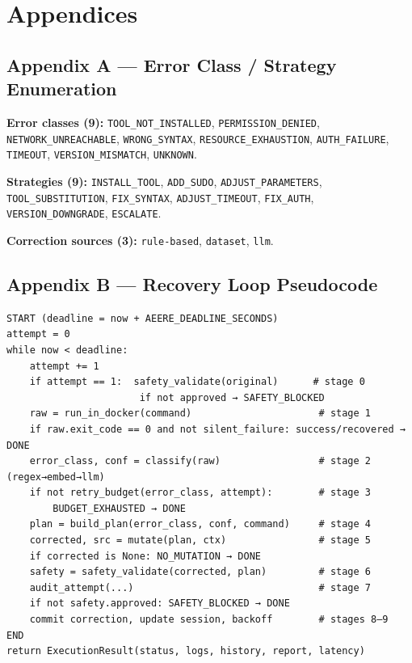 \documentclass[10pt,journal,onecolumn]{IEEEtran}
\begin{document}
\section{Appendices}

\subsection{Appendix A --- Error Class / Strategy Enumeration}

\textbf{Error classes (9):} \texttt{TOOL\_NOT\_INSTALLED}, \texttt{PERMISSION\_DENIED}, \texttt{NETWORK\_UNREACHABLE}, \texttt{WRONG\_SYNTAX}, \texttt{RESOURCE\_EXHAUSTION}, \texttt{AUTH\_FAILURE}, \texttt{TIMEOUT}, \texttt{VERSION\_MISMATCH}, \texttt{UNKNOWN}.

\textbf{Strategies (9):} \texttt{INSTALL\_TOOL}, \texttt{ADD\_SUDO}, \texttt{ADJUST\_PARAMETERS}, \texttt{TOOL\_SUBSTITUTION}, \texttt{FIX\_SYNTAX}, \texttt{ADJUST\_TIMEOUT}, \texttt{FIX\_AUTH}, \texttt{VERSION\_DOWNGRADE}, \texttt{ESCALATE}.

\textbf{Correction sources (3):} \texttt{rule-based}, \texttt{dataset}, \texttt{llm}.

\subsection{Appendix B --- Recovery Loop Pseudocode}

\begin{lstlisting}
START (deadline = now + AEERE_DEADLINE_SECONDS)
attempt = 0
while now < deadline:
    attempt += 1
    if attempt == 1:  safety_validate(original)      # stage 0
                       if not approved → SAFETY_BLOCKED
    raw = run_in_docker(command)                      # stage 1
    if raw.exit_code == 0 and not silent_failure: success/recovered → DONE
    error_class, conf = classify(raw)                 # stage 2 (regex→embed→llm)
    if not retry_budget(error_class, attempt):        # stage 3
        BUDGET_EXHAUSTED → DONE
    plan = build_plan(error_class, conf, command)     # stage 4
    corrected, src = mutate(plan, ctx)                # stage 5
    if corrected is None: NO_MUTATION → DONE
    safety = safety_validate(corrected, plan)         # stage 6
    audit_attempt(...)                                # stage 7
    if not safety.approved: SAFETY_BLOCKED → DONE
    commit correction, update session, backoff        # stages 8–9
END
return ExecutionResult(status, logs, history, report, latency)
\end{lstlisting}
\end{document}
